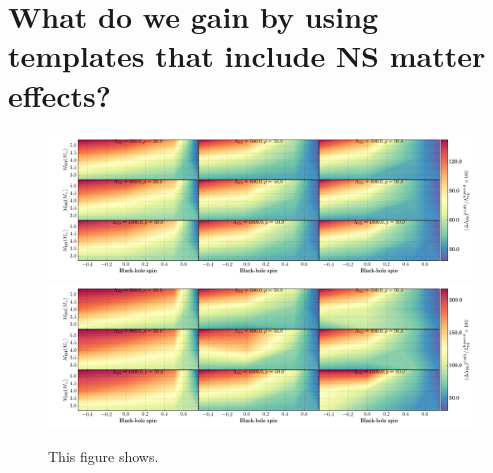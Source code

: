 \documentclass[aps,prd,amsmath,floats,floatfix, twocolumn,
superscriptaddress,nofootinbib,showpacs]{revtex4-1}
\begin{document}
\section{What do we gain by using templates that include NS matter effects?}
% 
\begin{figure}
\centering    
\includegraphics[width=2.1\columnwidth]{plots-TT/TT_LambdaCIWidths68_3_Lambda_SNR.png}\\
\includegraphics[width=2.1\columnwidth]{plots-TT/TT_LambdaCIWidths90_0_Lambda_SNR.png}
\caption{This figure shows.}
\label{fig:TT_LambdaCIWidths90_0_Lambda_SNR}
\end{figure}
\end{document}
